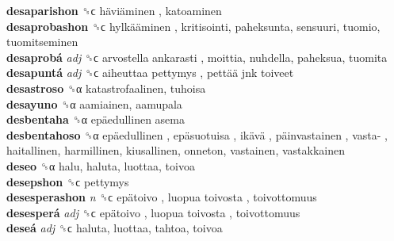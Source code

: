 \textbf{desaparishon} ␝ϲ   häviäminen , katoaminen  \\
\textbf{desaprobashon} ␝ϲ   hylkääminen , kritisointi, paheksunta, sensuuri, tuomio, tuomitseminen  \\
\textbf{desaprobá} \emph{adj}  ␝ϲ   arvostella ankarasti , moittia, nuhdella, paheksua, tuomita  \\
\textbf{desapuntá} \emph{adj}  ␝ϲ   aiheuttaa pettymys ,  pettää jnk toiveet   \\
\textbf{desastroso} ␝α  katastrofaalinen, tuhoisa  \\
\textbf{desayuno} ␝α  aamiainen, aamupala  \\
\textbf{desbentaha} ␝α   epäedullinen asema   \\
\textbf{desbentahoso} ␝α   epäedullinen ,  epäsuotuisa ,  ikävä ,  päinvastainen ,  vasta- , haitallinen, harmillinen, kiusallinen, onneton, vastainen, vastakkainen  \\
\textbf{deseo} ␝α  halu, haluta, luottaa, toivoa  \\
\textbf{desepshon} ␝ϲ  pettymys  \\
\textbf{desesperashon} \emph{n}  ␝ϲ   epätoivo ,  luopua toivosta , toivottomuus  \\
\textbf{desesperá} \emph{adj}  ␝ϲ   epätoivo ,  luopua toivosta , toivottomuus  \\
\textbf{deseá} \emph{adj}  ␝ϲ  haluta, luottaa, tahtoa, toivoa  \\
